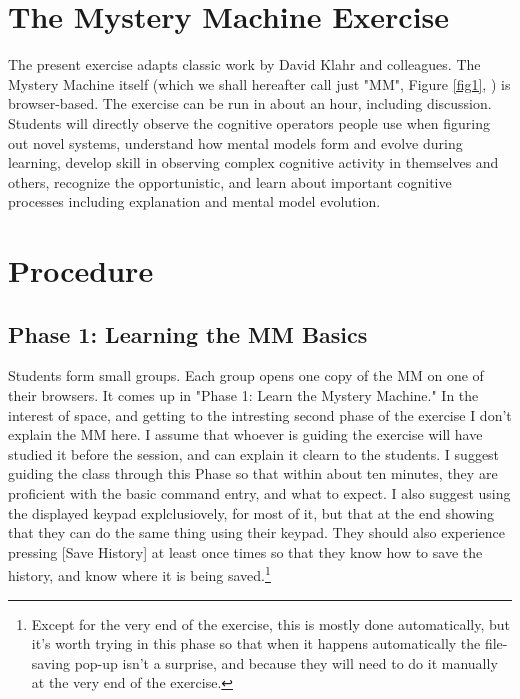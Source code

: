\documentclass[12pt,letterpaper]{article}
\begin{document}
\section{The Mystery Machine Exercise}

The present exercise adapts classic work by David Klahr and colleagues\cite{klahr2000exploring}. The Mystery Machine itself (which we shall hereafter call just "MM", Figure \ref{fig1}, \cite{MMRepo}) is browser-based. The exercise can be run in about an hour, including discussion. Students will directly observe the cognitive operators people use when figuring out novel systems, understand how mental models form and evolve during learning, develop skill in observing complex cognitive activity in themselves and others, recognize the opportunistic, and learn about important cognitive processes including explanation and mental model evolution.

\section{Procedure}

\subsection{Phase 1: Learning the MM Basics}

Students form small groups. Each group opens one copy of the MM on one of their browsers. It comes up in "Phase 1: Learn the Mystery Machine." In the interest of space, and getting to the intresting second phase of the exercise I don't explain the MM here. I assume that whoever is guiding the exercise will have studied it before the session, and can explain it clearn to the students. I suggest guiding the class through this Phase so that within about ten minutes, they are proficient with the basic command entry, and what to expect. I also suggest using the displayed keypad explclusiovely, for most of it, but that at the end showing that they can do the same thing using their keypad. They should also experience pressing [Save History] at least once times so that they know how to save the history, and know where it is being saved.\footnote{Except for the very end of the exercise, this is mostly done automatically, but it's worth trying in this phase so that when it happens automatically the file-saving pop-up isn't a surprise, and because they will need to do it manually at the very end of the exercise.} 
\end{document}
